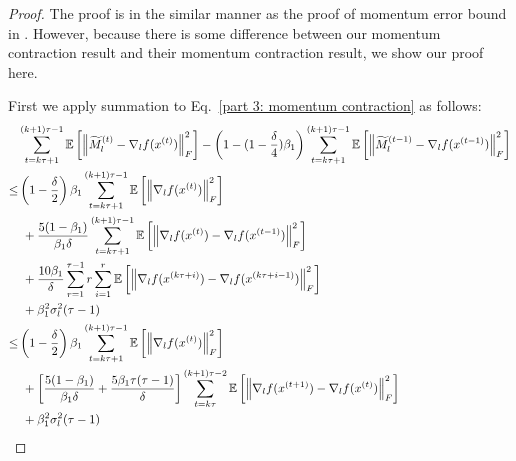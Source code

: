 \begin{proof}
The proof is in the similar manner as the proof of momentum error bound in \cite{he2024subspace}. However, because there is some difference between our momentum contraction result and their momentum contraction result, we show our proof here.

First we apply summation to Eq.~\ref{part 3: momentum contraction} as follows:
\begin{align} \label{momentum_error_proof_step1}
&\sum_{t=k\tau+1}^{(k+1)\tau-1}\mathbb{E}\left [ \left \| \tilde{M}_l^{(t)}-\nabla_l f(x^{(t)}) \right \|_F^2  \right ] -\left(1-(1-\frac{\delta}{4})\beta_1\right)\sum_{t=k\tau+1}^{(k+1)\tau-1}\mathbb{E}\left [ \left \| \tilde{M}_l^{(t-1)}-\nabla_l f(x^{(t-1)}) \right \|_F^2  \right ]\notag\\
\leq & \left(1-\frac{\delta}{2}\right)\beta_1\sum_{t=k\tau+1}^{(k+1)\tau-1}\mathbb{E}\left [ \left \|\nabla_l f(x^{(t)}) \right \|_F^2  \right ] \notag\\
&~+\frac{5(1-\beta_1)}{\beta_1\delta}\sum_{t=k\tau+1}^{(k+1)\tau-1}\mathbb{E}\left [ \left \|\nabla_l f(x^{(t)})-\nabla_l f(x^{(t-1)}) \right \|_F^2  \right ]\notag\\
&~+\frac{10\beta_1}{\delta}\sum_{r=1}^{\tau-1}r\sum_{i=1}^{r}\mathbb{E}\left [ \left \|\nabla_l f(x^{(k\tau+i)})-\nabla_l f(x^{(k\tau+i-1)}) \right \|_F^2  \right ]\notag\\
&~+\beta_1^2\sigma_l^2(\tau-1)\notag\\
\leq & \left(1-\frac{\delta}{2}\right)\beta_1\sum_{t=k\tau+1}^{(k+1)\tau-1}\mathbb{E}\left [ \left \|\nabla_l f(x^{(t)}) \right \|_F^2  \right ] \notag\\
&~+\left [   \frac{5(1-\beta_1)}{\beta_1\delta}+\frac{5\beta_1\tau(\tau-1)}{\delta}    \right ]\sum_{t=k\tau}^{(k+1)\tau-2}\mathbb{E}\left [ \left \|\nabla_l f(x^{(t+1)})-\nabla_l f(x^{(t)}) \right \|_F^2  \right ]\notag\\
&~+\beta_1^2\sigma_l^2(\tau-1)
\end{align}
 

\end{proof}
